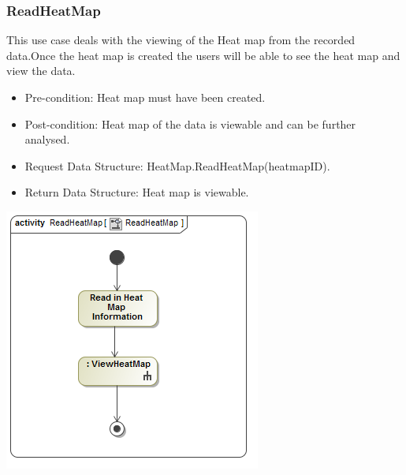 	
	\subsubsection{ReadHeatMap}
	This use case deals with the viewing of the Heat map from the recorded data.Once the heat map is created the users will be able to see the heat map and view the data.
	\begin{itemize}
		\item Pre-condition: Heat map must have been created.
		\item Post-condition: Heat map of the data is viewable and can be further analysed.
		\item Request Data Structure: HeatMap.ReadHeatMap(heatmapID).
		\item Return Data Structure: Heat map is viewable.
	\end{itemize}
	\includegraphics[scale=0.5]{Diagrams/Activity_Diagram__ReadHeatMap__ReadHeatMap.png}
	
